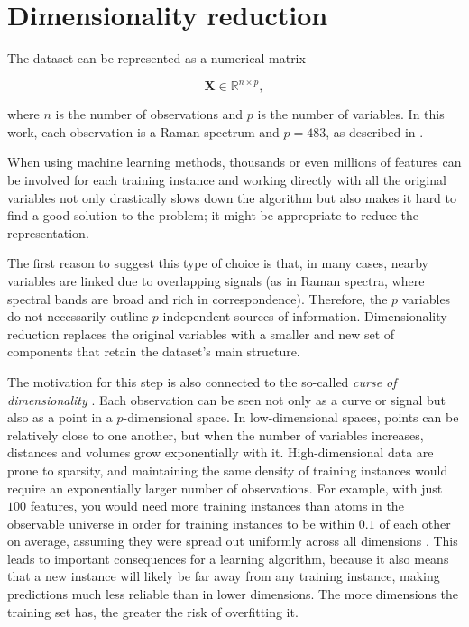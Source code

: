 \section{Dimensionality reduction}
\label{sec:dimensionality_reduction}

The dataset can be represented as a numerical matrix

\begin{equation}
    \mathbf{X} \in \mathbb{R}^{n \times p},
    \label{eq:pca_data_matrix}
\end{equation}

where \(n\) is the number of observations and \(p\) is the number of variables. In this work, each observation is a Raman spectrum and \(p = 483\), as described in .

When using machine learning methods, thousands or even millions of features can be involved for
each training instance and working directly with all the original variables not only drastically slows down the algorithm but also makes it hard to find a good solution to the problem; it might be appropriate to reduce the representation.

The first reason to suggest this type of choice is that, in many cases, nearby variables are linked due to overlapping signals (as in Raman spectra, where spectral bands are broad and rich in correspondence). Therefore, the \(p\) variables do not necessarily outline \(p\) independent sources of information. Dimensionality reduction replaces the original variables with a smaller and new set of components that retain the dataset's main structure.

The motivation for this step is also connected to the so-called \textit{curse of dimensionality} \cite{geron2022hands}. Each observation can be seen not only as a curve or signal but also as a point in a \(p\)-dimensional space. 
In low-dimensional spaces, points can be relatively close to one another, but when the number of variables increases, distances and volumes grow exponentially with it. High-dimensional data are prone to sparsity, and maintaining the same density of training instances would require an exponentially larger number of observations. For example, with just \(100\) features, you would need more training instances than atoms in the observable universe in order for training instances to be within \(0.1\) of each other on average, assuming they were spread out uniformly across all dimensions \cite{geron2022hands}. 
This leads to important consequences for a learning algorithm, because it also means that a new instance
will likely be far away from any training instance, making predictions much less reliable than in lower dimensions.
The more dimensions the training set has, the greater the risk of overfitting it.

